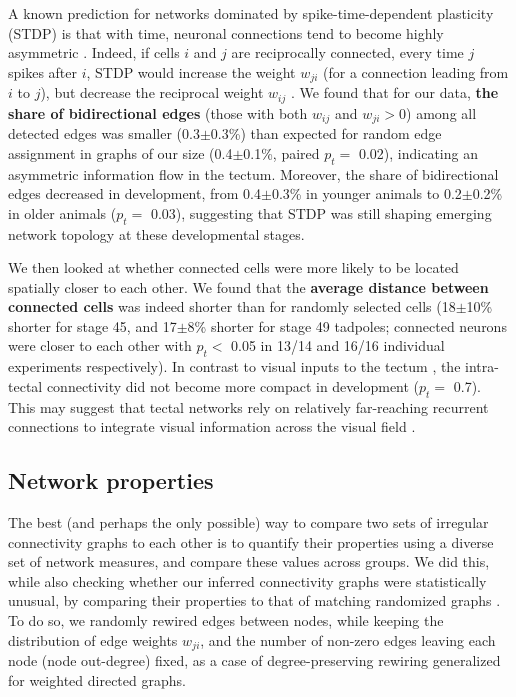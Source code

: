 \documentclass{article}
\begin{document}
A known prediction for networks dominated by spike-time-dependent plasticity (STDP) is that with time, neuronal connections tend to become highly asymmetric \citep{pratt2008recurrent, richards2010stdp}. Indeed, if cells $i$ and $j$ are reciprocally connected, every time $j$ spikes after $i$, STDP would increase the weight $w_{ji}$ (for a connection leading from $i$ to $j$), but decrease the reciprocal weight $w_{ij}$ \citep{abbott1996ltpsequence, fiete2010chains}. We found that for our data, \textbf{the share of bidirectional edges} (those with both $w_{ij}$ and $w_{ji}>$0) among all detected edges was smaller (0.3$\pm$0.3\%) than expected for random edge assignment in graphs of our size (0.4$\pm$0.1\%, paired $p_t=$ 0.02), indicating an asymmetric information flow in the tectum. Moreover, the share of bidirectional edges decreased in development, from 0.4$\pm$0.3\% in younger animals to 0.2$\pm$0.2\% in older animals ($p_t=$ 0.03), suggesting that STDP was still shaping emerging network topology at these developmental stages.

We then looked at whether connected cells were more likely to be located spatially closer to each other. We found that the \textbf{average distance between connected cells} was indeed shorter than for randomly selected cells (18$\pm$10\% shorter for stage 45, and 17$\pm$8\% shorter for stage 49 tadpoles; connected neurons were closer to each other with $p_t<$ 0.05 in 13/14 and 16/16 individual experiments respectively). In contrast to visual inputs to the tectum \citep{tao2005refinement}, the intra-tectal connectivity did not become more compact in development ($p_t=$ 0.7). This may suggest that tectal networks rely on relatively far-reaching recurrent connections to integrate visual information across the visual field \citep{baginskas2009recurrent, liu2016jumbo, jang2016}.

\subsection*{Network properties}

The best (and perhaps the only possible) way to compare two sets of irregular connectivity graphs to each other is to quantify their properties using a diverse set of network measures, and compare these values across groups. We did this, while also checking whether our inferred connectivity graphs were statistically unusual, by comparing their properties to that of matching randomized graphs \citep{ansmann2012surrogate}. To do so, we randomly rewired edges between nodes, while keeping the distribution of edge weights $w_{ji}$, and the number of non-zero edges leaving each node (node out-degree) fixed, as a case of degree-preserving rewiring \citep{maslov2002} generalized for weighted directed graphs. 
\end{document}
